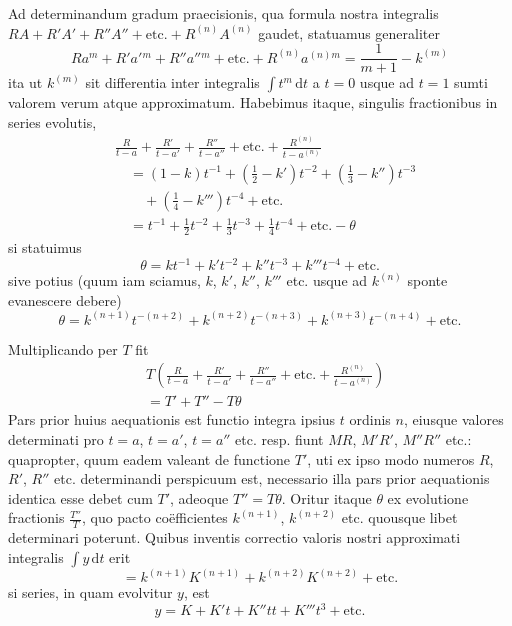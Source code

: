Ad determinandum gradum praecisionis, qua formula nostra integralis $RA+R'A'+R''A''+\text{etc.}+R^{(n)}A^{(n)}$ gaudet, statuamus generaliter
\[
Ra^m+R'a'{}^m+R''a''{}^m+\text{etc.}+R^{(n)}a^{(n)m}=\frac{1}{m+1}-k^{(m)}
\]
ita ut $k^{(m)}$ sit differentia inter integralis $\int t^m\,\mathrm{d}t$ a $t=0$ usque ad $t=1$ sumti valorem verum atque approximatum. Habebimus itaque, singulis fractionibus in series evolutis,
\[
\begin{aligned}
&\frac{R}{t-a}+\frac{R'}{t-a'}+\frac{R''}{t-a''}+\text{etc.}+\frac{R^{(n)}}{t-a^{(n)}}\\
&\quad=(1-k)t^{-1}+(\tfrac12-k')t^{-2}+(\tfrac13-k'')t^{-3}\\ &\qquad+(\tfrac14-k''')t^{-4}+\text{etc.}\\
&\quad=t^{-1}+\tfrac12t^{-2}+\tfrac13t^{-3}+\tfrac14t^{-4}+\text{etc.}-\theta
\end{aligned}
\]
si statuimus
\[
\theta=kt^{-1}+k't^{-2}+k''t^{-3}+k'''t^{-4}+\text{etc.}
\]
sive potius (quum iam sciamus, $k$, $k'$, $k''$, $k'''$ etc. usque ad $k^{(n)}$ sponte evanescere debere)
\[
\theta=k^{(n+1)}t^{-(n+2)}+k^{(n+2)}t^{-(n+3)}+k^{(n+3)}t^{-(n+4)}+\text{etc.}
\]

Multiplicando per $T$ fit
\[
\begin{aligned}&T\left(\frac{R}{t-a}+\frac{R'}{t-a'}+\frac{R''}{t-a''}+\text{etc.}+\frac{R^{(n)}}{t-a^{(n)}}\right)\\ &=T'+T''-T\theta\end{aligned}
\]
Pars prior huius aequationis est functio integra ipsius $t$ ordinis $n$, eiusque valores determinati pro $t=a$, $t=a'$, $t=a''$ etc. resp. fiunt $MR$, $M'R'$, $M''R''$ etc.: quapropter, quum eadem valeant de functione $T'$, uti ex ipso modo numeros $R$, $R'$, $R''$ etc. determinandi perspicuum est, necessario illa pars prior aequationis identica esse debet cum $T'$, adeoque $T''=T\theta$. Oritur itaque $\theta$ ex evolutione fractionis $\frac{T''}{T}$, quo pacto co\"efficientes $k^{(n+1)}$, $k^{(n+2)}$ etc. quousque libet determinari poterunt. Quibus inventis correctio valoris nostri approximati integralis $\int y\,\mathrm{d}t$ erit
\[
=k^{(n+1)}K^{(n+1)}+k^{(n+2)}K^{(n+2)}+\text{etc.}
\]
si series, in quam evolvitur $y$, est
\[
y=K+K't+K''tt+K'''t^3+\text{etc.}
\]

